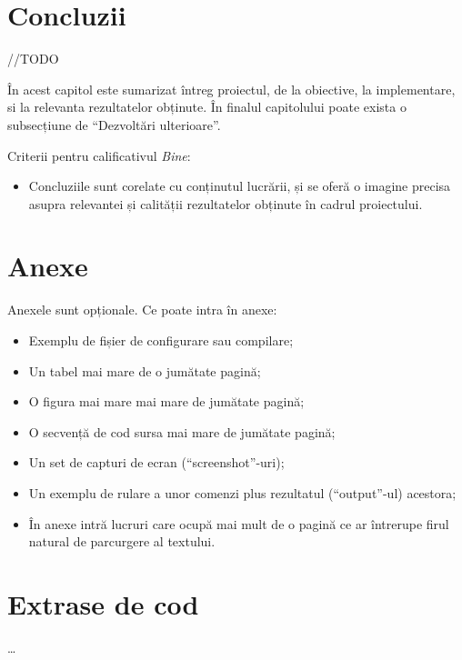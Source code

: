 \documentclass[12pt,a4paper]{report}
\numberwithin{equation}{section} %
\begin{document}
\chapter{\label{sec:concluzii}Concluzii}

//TODO

În acest capitol este sumarizat întreg proiectul, de la obiective, la implementare, si la relevanta rezultatelor obținute. În finalul capitolului poate exista o subsecțiune de ``Dezvoltări ulterioare''.

Criterii pentru calificativul \textit{Bine}:
\begin{itemize}
	\item	Concluziile sunt corelate cu conținutul lucrării, și se oferă o imagine precisa asupra relevantei și calității rezultatelor obținute în cadrul proiectului.
\end{itemize}







\chapter*{Anexe}

Anexele sunt opționale.
Ce poate intra în anexe:
\begin{itemize}
	\item	Exemplu de fișier de configurare sau compilare;
	\item	Un tabel mai mare de o jumătate pagină;
	\item	O figura mai mare mai mare de jumătate pagină;
	\item	O secvență de cod sursa mai mare de jumătate pagină;
	\item	Un set de capturi de ecran (``screenshot''-uri);
	\item	Un exemplu de rulare a unor comenzi plus rezultatul (``output''-ul) acestora;
	\item 	În anexe intră lucruri care ocupă mai mult de o pagină ce ar întrerupe firul natural de parcurgere al textului.
\end{itemize}

\begin{appendices}
	\label{anexa}
	\chapter{Extrase de cod} %
	\ldots


\end{appendices}
\end{document}
